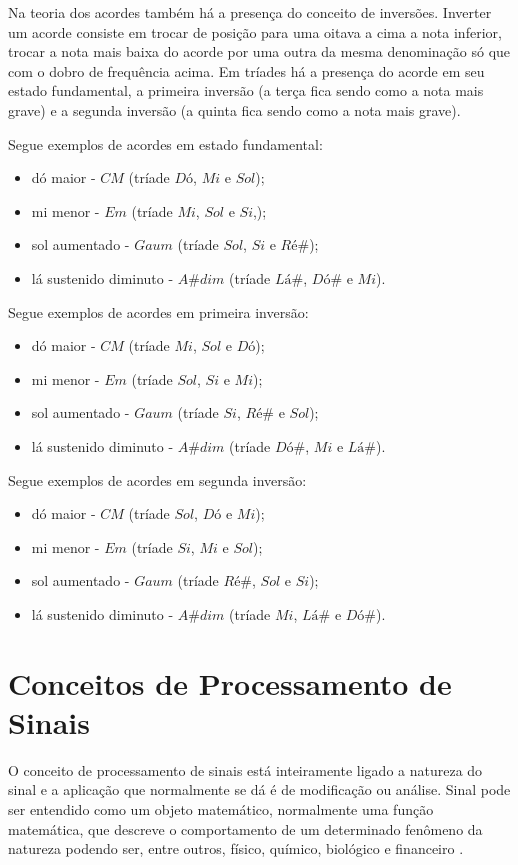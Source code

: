 Na teoria dos acordes também há a presença do conceito de inversões. Inverter um acorde consiste em trocar de posição para uma oitava a cima a nota inferior, trocar a nota mais baixa do acorde por uma outra da mesma denominação só que com o dobro de frequência acima. Em tríades há a presença do acorde em seu estado fundamental, a primeira inversão (a terça fica sendo como a nota mais grave) e a segunda inversão (a quinta fica sendo como a nota mais grave).

Segue exemplos de acordes em estado fundamental: 
\begin{itemize}
	\item dó maior - $CM$ (tríade $Dó$, $Mi$ e $Sol$);
	\item mi menor - $Em$ (tríade  $Mi$, $Sol$ e $Si$,);
	\item sol aumentado - $Gaum$ (tríade  $Sol$, $Si$ e $Ré\#$);
	\item lá sustenido diminuto - $A\#dim$ (tríade $Lá\#$, $Dó\#$ e $Mi$).
\end{itemize}

Segue exemplos de acordes em primeira inversão: 
\begin{itemize}
	\item dó maior - $CM$ (tríade $Mi$, $Sol$ e $Dó$);
	\item mi menor - $Em$ (tríade $Sol$, $Si$ e $Mi$);
	\item sol aumentado - $Gaum$ (tríade $Si$, $Ré\#$ e $Sol$);
	\item lá sustenido diminuto - $A\#dim$ (tríade $Dó\#$, $Mi$ e $Lá\#$).
\end{itemize}

Segue exemplos de acordes em segunda inversão: 
\begin{itemize}
	\item dó maior - $CM$ (tríade $Sol$, $Dó$ e $Mi$);
	\item mi menor - $Em$ (tríade $Si$, $Mi$ e $Sol$);
	\item sol aumentado - $Gaum$ (tríade $Ré\#$, $Sol$ e $Si$);
	\item lá sustenido diminuto - $A\#dim$ (tríade $Mi$, $Lá\#$ e $Dó\#$).
\end{itemize}

\section{Conceitos de Processamento de Sinais}
\label{sec:conceitosprocessamentosinais}
O conceito de processamento de sinais está inteiramente ligado a natureza do sinal e a aplicação que normalmente se dá é de modificação ou análise. Sinal pode ser entendido como um objeto matemático, normalmente uma função matemática, que descreve o comportamento de um determinado fenômeno da natureza podendo ser, entre outros, físico, químico, biológico e financeiro \cite{oppenheim}.

